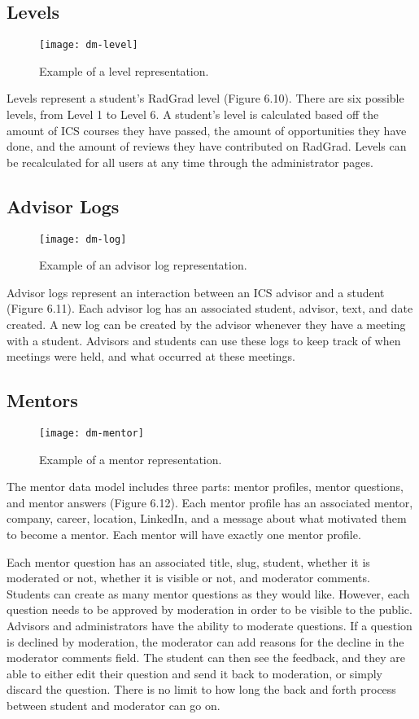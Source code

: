 \subsection{Levels}
\begin{figure}[htbp!]
\centering
\texttt{[image: dm-level]}
\caption{Example of a level representation.}
\end{figure}
Levels represent a student's RadGrad level (Figure 6.10). There are six possible levels, from Level 1 to Level 6. A student's level is calculated based off the amount of ICS courses they have passed, the amount of opportunities they have done, and the amount of reviews they have contributed on RadGrad. Levels can be recalculated for all users at any time through the administrator pages.

\subsection{Advisor Logs}
\begin{figure}[htbp!]
\centering
\texttt{[image: dm-log]}
\caption{Example of an advisor log representation.}
\end{figure}
Advisor logs represent an interaction between an ICS advisor and a student (Figure 6.11). Each advisor log has an associated student, advisor, text, and date created. A new log can be created by the advisor whenever they have a meeting with a student. Advisors and students can use these logs to keep track of when meetings were held, and what occurred at these meetings. 

\subsection{Mentors}
\begin{figure}[htbp!]
\centering
\texttt{[image: dm-mentor]}
\caption{Example of a mentor representation.}
\end{figure}
The mentor data model includes three parts: mentor profiles, mentor questions, and mentor answers (Figure 6.12). Each mentor profile has an associated mentor, company, career, location, LinkedIn, and a message about what motivated them to become a mentor. Each mentor will have exactly one mentor profile.  

Each mentor question has an associated title, slug, student, whether it is moderated or not, whether it is visible or not, and moderator comments. Students can create as many mentor questions as they would like. However, each question needs to be approved by moderation in order to be visible to the public. Advisors and administrators have the ability to moderate questions. If a question is declined by moderation, the moderator can add reasons for the decline in the moderator comments field. The student can then see the feedback, and they are able to either edit their question and send it back to moderation, or simply discard the question. There is no limit to how long the back and forth process between student and moderator can go on. 

